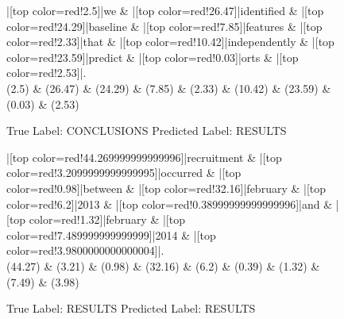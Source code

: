 \documentclass[a4paper, landscape]{article}
\begin{document}
\begin{figure}
\begin{center}
\begin{dependency}
\begin{deptext}
|[top color=red!2.5]|we \& |[top color=red!26.47]|identified \& |[top color=red!24.29]|baseline \& |[top color=red!7.85]|features \& |[top color=red!2.33]|that \& |[top color=red!10.42]|independently \& |[top color=red!23.59]|predict \& |[top color=red!0.03]|orts \& |[top color=red!2.53]|.\\
(2.5) \& (26.47) \& (24.29) \& (7.85) \& (2.33) \& (10.42) \& (23.59) \& (0.03) \& (2.53)\\
\end{deptext}
\end{dependency}
\end{center}
\caption{True Label: CONCLUSIONS Predicted Label: RESULTS}
\end{figure}
\clearpage
\begin{figure}
\begin{center}
\begin{dependency}
\begin{deptext}
|[top color=red!44.269999999999996]|recruitment \& |[top color=red!3.2099999999999995]|occurred \& |[top color=red!0.98]|between \& |[top color=red!32.16]|february \& |[top color=red!6.2]|2013 \& |[top color=red!0.38999999999999996]|and \& |[top color=red!1.32]|february \& |[top color=red!7.489999999999999]|2014 \& |[top color=red!3.9800000000000004]|.\\
(44.27) \& (3.21) \& (0.98) \& (32.16) \& (6.2) \& (0.39) \& (1.32) \& (7.49) \& (3.98)\\
\end{deptext}
\end{dependency}
\end{center}
\caption{True Label: RESULTS Predicted Label: RESULTS}
\end{figure}
\clearpage
\end{document}
